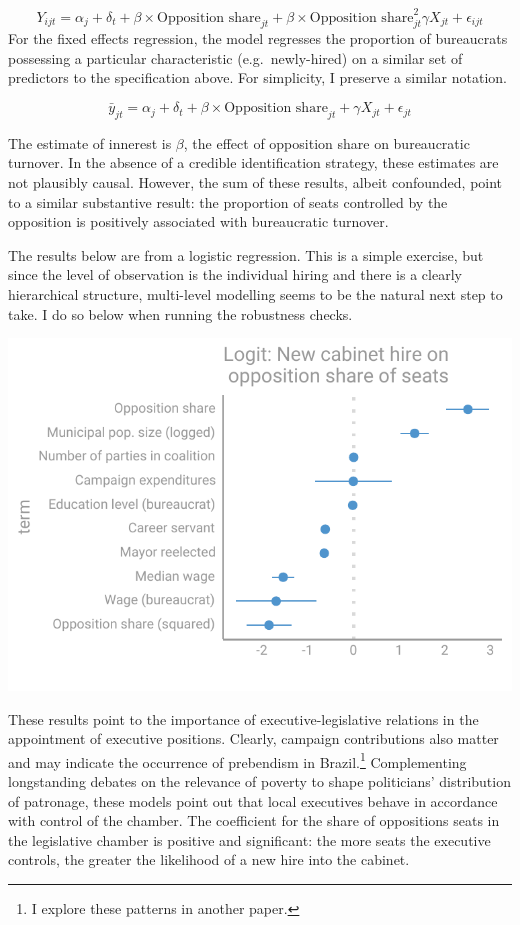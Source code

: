 \documentclass[12pt,]{article}
\let\rmarkdownfootnote\footnote%
\def\footnote{\protect\rmarkdownfootnote}
\begin{document}
\[Y_{ijt} = \alpha_j + \delta_t + \beta\times\text{Opposition share}_{jt} + \beta\times\text{Opposition share}^2_{jt} \gamma X_{jt} + \epsilon_{ijt}\]
For the fixed effects regression, the model regresses the proportion of
bureaucrats possessing a particular characteristic (e.g.~newly-hired) on
a similar set of predictors to the specification above. For simplicity,
I preserve a similar notation.

\[\bar{y}_{jt} = \alpha_j + \delta_t + \beta\times\text{Opposition share}_{jt} + \gamma X_{jt} + \epsilon_{jt}\]

The estimate of innerest is \(\beta\), the effect of opposition share on
bureaucratic turnover. In the absence of a credible identification
strategy, these estimates are not plausibly causal. However, the sum of
these results, albeit confounded, point to a similar substantive result:
the proportion of seats controlled by the opposition is positively
associated with bureaucratic turnover.

The results below are from a logistic regression. This is a simple
exercise, but since the level of observation is the individual hiring
and there is a clearly hierarchical structure, multi-level modelling
seems to be the natural next step to take. I do so below when running
the robustness checks.

\begin{center}\includegraphics{dissertation_files/figure-latex/hiring micro-1} \end{center}

These results point to the importance of executive-legislative relations
in the appointment of executive positions. Clearly, campaign
contributions also matter and may indicate the occurrence of prebendism
in Brazil.\footnote{I explore these patterns in another paper.}
Complementing longstanding debates on the relevance of poverty to shape
politicians' distribution of patronage, these models point out that
local executives behave in accordance with control of the chamber. The
coefficient for the share of oppositions seats in the legislative
chamber is positive and significant: the more seats the executive
controls, the greater the likelihood of a new hire into the cabinet.
\end{document}

